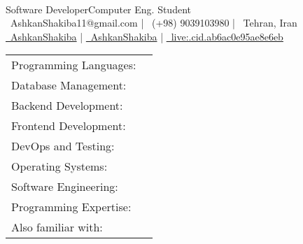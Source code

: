 \documentclass[]{awesome-cv}
\begin{document}
    
\begin{center}
	  \\
	\vspace{2mm}
	\textcolor{awesome}{Software Developer{\enskip\cdotp\enskip}Computer Eng. Student} \\
	\vspace{2mm}
	{\faEnvelope\ AshkanShakiba11@gmail.com} | {\faMobile\ (+98) 9039103980} | {\faMapMarker\ Tehran, Iran} \\
	{\href{https://linkedin.com/in/AshkanShakiba}{\faLinkedin\ AshkanShakiba}} | {\href{https://github.com/AshkanShakiba}{\faGithub\ AshkanShakiba}} | {\href{skype:live:.cid.ab6ac0e95ae8e6eb?chat}{\faSkype\ live:.cid.ab6ac0e95ae8e6eb}}
\end{center}
\begin{cventries}
	\cventry
	{}
	{\def\arraystretch{1.15}{\begin{tabular}{ l l }
		\vspace{0.25mm}Programming Languages:  & {\skill{ Python, Java, JavaScript, TypeScript, Kotlin, C}} \\
		\vspace{0.25mm}Database Management:  & {\skill{ SQL, MySQL, PostgreSQL, elasticsearch, redis}} \\
		\vspace{0.25mm}Backend Development:  & {\skill{ Django, Django REST framework, CherryPy}} \\
		\vspace{0.25mm}Frontend Development:  & {\skill{ HTML, CSS, Angular, Flutter, Scss}} \\
		\vspace{0.25mm}DevOps and Testing:  & {\skill{ Git, Docker, Selenium}} \\
		\vspace{0.25mm}Operating Systems:  & {\skill{ Linux (Ubuntu), Windows}} \\
		\vspace{0.25mm}Software Engineering:  & {\skill{ Agile and Scrum, Design Patterns, Testing}} \\
		\vspace{0.25mm}Programming Expertise:  & {\skill{ Data Structures and Algorithms, Object-oriented Programming, Microservices}} \\
		\vspace{0.25mm}Also familiar with:  & {\skill{ Golang, Blockchain and Cryptocurrencies, Android Development, React, kibana}} \\
		\end{tabular}}}
	{}
	{}
	{}
\end{cventries}
\end{document}
